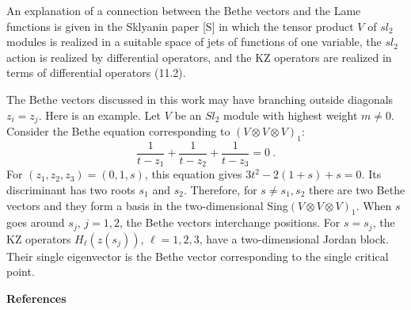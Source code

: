 An explanation of a connection between the Bethe vectors and the Lame
functions is given in the Sklyanin paper [S] in which the
tensor product $V$ of $sl_2$ modules is realized in a suitable space
of jets of functions of one variable, the $sl_2$ action is realized by
differential operators, and the KZ operators are realized in terms of
differential operators (11.2).

\bigskip\bigskip
{}

The Bethe vectors discussed in this work may have branching outside
diagonals $z_i=z_j$. Here is an example. Let $V$ be an $Sl_2$ module
with highest weight $m\neq 0$. Consider the Bethe equation
corresponding to $(V\otimes V\otimes V)_1$:
$$
\frac{1}{t-z_1} + \frac{1}{t-z_2} + \frac{1}{t-z_3} =0 \ .
$$
For $(z_1,z_2,z_3)=(0,1,s)$, this equation gives
$3t^2-2(1+s)+s=0$. Its discriminant has two roots $s_1$ and $s_2$.
Therefore, for $s\neq s_1,s_2$ there are two Bethe vectors and they
form a basis in the two-dimensional Sing$(V\otimes V\otimes V)_1$.
When $s$ goes around $s_j$, $j=1,2$, the Bethe vectors interchange
positions. For $s=s_j$, the KZ operators $H_\ell(z(s_j))$, $\ell
=1,2,3$, have a two-dimensional Jordan block. Their single eigenvector
is the Bethe vector corresponding to the single critical point.

\bigskip\bigskip
\centerline{\bf References}
\bigskip

